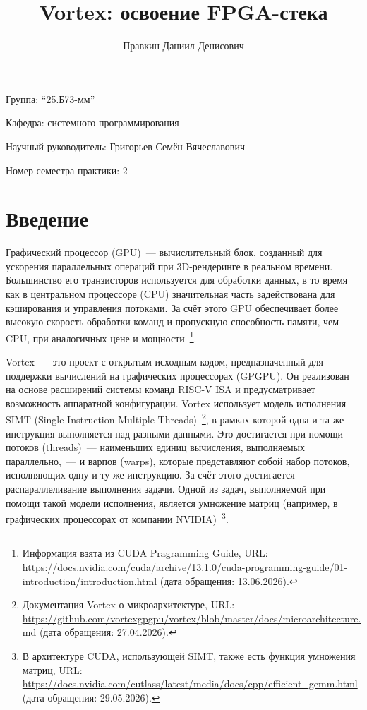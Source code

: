 \documentclass[a4paper]{article}
\title{Vortex: освоение FPGA-стека}
\author{Правкин Даниил Денисович}
\date{}
\begin{document}
\maketitle

\begin{flushright}
    Группа: \enquote{25.Б73-мм}

    Кафедра: системного программирования


    Научный руководитель: Григорьев Семён Вячеславович

    
    Номер семестра практики: 2
\end{flushright} 


\section{Введение}

Графический процессор (GPU)~--- вычислительный блок, созданный для ускорения параллельных операций при 3D-рендеринге в реальном времени. Большинство его транзисторов используется для обработки данных, в то время как в центральном процессоре (CPU) значительная часть задействована для кэширования и управления потоками. За счёт этого GPU обеспечивает более высокую скорость обработки команд и пропускную способность памяти, чем CPU, при аналогичных цене и мощности~\footnote{Информация взята из CUDA Pragramming Guide, URL: \url{https://docs.nvidia.com/cuda/archive/13.1.0/cuda-programming-guide/01-introduction/introduction.html} (дата обращения: 13.06.2026).}.

Vortex~--- это проект с открытым исходным кодом, предназначенный для поддержки вычислений на графических процессорах (GPGPU). Он реализован на основе расширений системы команд RISC-V ISA и предусматривает возможность аппаратной конфигурации. Vortex использует модель исполнения SIMT (Single Instruction Multiple Threads)~\footnote{Документация Vortex о микроархитектуре, URL: \url{https://github.com/vortexgpgpu/vortex/blob/master/docs/microarchitecture.md} (дата обращения: 27.04.2026).}, в рамках которой одна и та же инструкция выполняется над разными данными. Это достигается при помощи потоков (threads)~--- наименьших единиц вычисления, выполняемых параллельно,~--- и варпов (warps), которые представляют собой набор потоков, исполняющих одну и ту же инструкцию. За счёт этого достигается распараллеливание выполнения задачи. Одной из задач, выполняемой при помощи такой модели исполнения, является умножение матриц (например, в графических процессорах от компании NVIDIA)~\footnote{В архитектуре CUDA, использующей SIMT, также есть функция умножения матриц, URL: \url{https://docs.nvidia.com/cutlass/latest/media/docs/cpp/efficient_gemm.html} (дата обращения: 29.05.2026).}.
\end{document}
